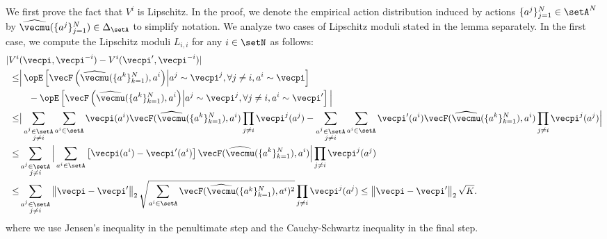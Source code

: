 We first prove the fact that $V^i$ is Lipschitz.
In the proof, we denote the empirical action distribution induced by actions $\{a^j\}_{j=1}^N\in\setA^N$ by $\widehat{\vecmu}(\{a^j\}_{j=1}^N) \in \Delta_\setA$ to simplify notation.
We analyze two cases of Lipschitz moduli stated in the lemma separately. In the first case, we compute the Lipschitz moduli $L_{i,i}$ for any $i\in\setN$ as follows:
\begin{align*}
    |V^i&(\vecpi, \vecpi^{-i}) - V^i (\vecpi', \vecpi^{-i})| \\
    \leq & \Big| \Exop \left[ \vecF\left(\widehat{\vecmu}(\{a^k\}_{k=1}^N), a^i\right) \middle|
a^j \sim \vecpi^j, \forall j \neq i, a^i \sim \vecpi
\right] \\
    &\quad - \Exop \left[ \vecF\left(\widehat{\vecmu}(\{a^k\}_{k=1}^N),a^i\right) \middle|
a^j \sim \vecpi^j, \forall j \neq i, a^i \sim \vecpi' \right] \Big| \\
\leq & \big| \sum_{\substack{a^j \in \setA \\ j\neq i}}  \sum_{a^i \in \setA}\vecpi(a^i) \vecF(\widehat{\vecmu}(\{a^k\}_{k=1}^N), a^i)\prod_{j\neq i} \vecpi^j(a^j) - \sum_{\substack{a^j \in \setA \\ j\neq i}} \sum_{a^i \in \setA} \vecpi'(a^i) \vecF(\widehat{\vecmu}(\{a^k\}_{k=1}^N), a^i) \prod_{j\neq i} \vecpi^j(a^j) 
 \Big| \\
\leq & \sum_{\substack{a^j \in \setA \\ j\neq i}}  \Big|\sum_{a^i \in \setA}\left[ \vecpi(a^i) - \vecpi'(a^i)\right] \vecF(\widehat{\vecmu}(\{a^k\}_{k=1}^N), a^i) \Big| \prod_{j\neq i} \vecpi^j(a^j) \\
\leq & \sum_{\substack{a^j \in \setA \\ j\neq i}}  \left\| \vecpi - \vecpi'\right\|_2 \sqrt{\sum_{a^i \in \setA} \vecF(\widehat{\vecmu}(\{a^k\}_{k=1}^N), a^i)^2} \prod_{j\neq i} \vecpi^j(a^j) 
\leq \left\| \vecpi - \vecpi'\right\|_2 \sqrt{K}.
\end{align*}
where we use Jensen's inequality in the penultimate step and the Cauchy-Schwartz inequality in the final step.

